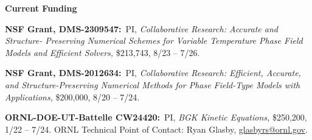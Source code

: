 \documentclass[11pt]{letter}
\begin{document}
	
{\LARGE\bf Current Funding}
    \begin{description}
    
	\item
\textbf{NSF Grant, DMS-2309547:}~PI, {\sl Collaborative Research: Accurate and Structure- Preserving Numerical Schemes for Variable Temperature Phase Field Models and Efficient Solvers,} \$213,743, 8/23 -- 7/26.
    
    \item
\textbf{NSF Grant, DMS-2012634:}~PI, {\sl Collaborative Research:  Efficient, Accurate, and Structure-Preserving Numerical Methods for Phase Field-Type Models with Applications,} \$200,000, 8/20 -- 7/24.

    \item
\textbf{ORNL-DOE-UT-Battelle CW24420:}~PI, {\sl BGK Kinetic Equations,} \$250,200, 1/22 -- 7/24. ORNL Technical Point of Contact: Ryan Glasby, \url{glasbyrs@ornl.gov}.
    
    \end{description}
    
\end{document}
